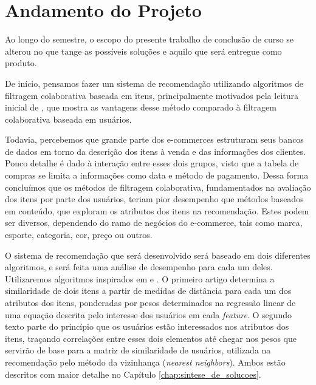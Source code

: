 \chapter[Andamento do Projeto]{Andamento do Projeto}
\label{chap:andamento_do_projeto}


Ao longo do semestre, o escopo do presente trabalho de conclusão de curso se alterou no que tange as possíveis soluções e aquilo que será entregue como produto.

De início, pensamos fazer um sistema de recomendação utilizando algoritmos de filtragem colaborativa baseada em itens, principalmente motivados pela leitura inicial de \cite{linden2003amazon}, que mostra as vantagens desse método comparado à filtragem colaborativa baseada em usuários. 

Todavia, percebemos que grande parte dos e-commerces estruturam seus bancos de dados em torno da descrição dos itens à venda e das informações dos clientes. Pouco detalhe é dado à interação entre esses dois grupos, visto que a tabela de compras se limita a informações como data e método de pagamento. Dessa forma concluímos que os métodos de filtragem colaborativa, fundamentados na avaliação dos itens por parte dos usuários, teriam pior desempenho que métodos baseados em conteúdo, que exploram os atributos dos itens na recomendação. Estes podem ser diversos, dependendo do ramo de negócios do e-commerce, tais como marca, esporte, categoria, cor, preço ou outros.

O sistema de recomendação que será desenvolvido será baseado em dois diferentes algoritmos, e será feita uma análise de desempenho  para cada um deles. Utilizaremos algoritmos inspirados em \cite{debnath2008feature} e \cite{symeonidis2007feature}. O primeiro artigo determina a similaridade de dois itens a partir de medidas de distância para cada um dos atributos dos itens, ponderadas por pesos determinados na regressão linear de uma equação descrita pelo interesse dos usuários em cada \textit{feature}. O segundo texto parte do princípio que os usuários estão interessados nos atributos dos itens, traçando correlações entre esses dois elementos até chegar nos pesos que servirão de base para a matriz de similaridade de usuários, utilizada na recomendação pelo método da vizinhança (\textit{nearest neighbors}). Ambos estão descritos com maior detalhe no Capítulo \ref{chap:sintese_de_solucoes}.